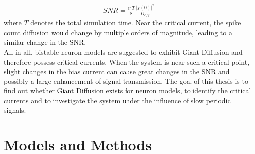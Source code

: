 \documentclass[12pt,a4paper]{article}
\begin{document}
\begin{align*}
SNR=\frac{\epsilon ^2T}{8}\frac{|\chi(0)|^2}{D_{eff}}
\end{align*}
where $T$ denotes the total simulation time. Near the critical current, the spike count diffusion would change by multiple orders of magnitude, leading to a similar change in the SNR. \\
All in all, bistable neuron models are suggested to exhibit Giant Diffusion and therefore possess critical currents. When the system is near such a critical point, slight changes in the bias current can cause great changes in the SNR and possibly a large enhancement of signal transmission. The goal of this thesis is to find out whether Giant Diffusion exists for neuron models, to identify the critical currents and to investigate the system under the influence of slow periodic signals. 

\section{Models and Methods}
\end{document}
